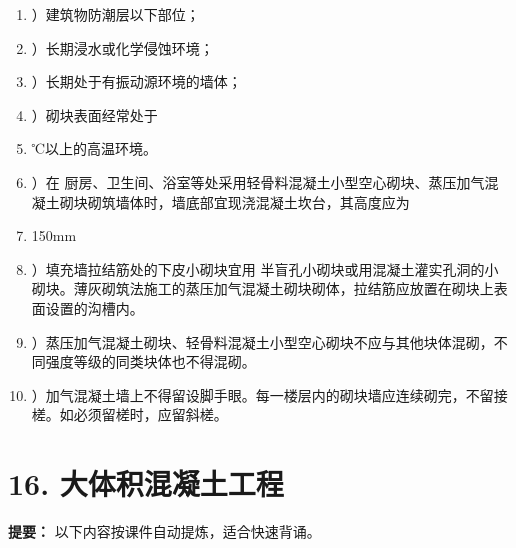 \documentclass[UTF8,fontset=fandol,11pt]{ctexart}
\begin{document}
\begin{enumerate}[label=\arabic*.]
\item ）建筑物防潮层以下部位；

\item ）长期浸水或化学侵蚀环境；

\item ）长期处于有振动源环境的墙体；

\item ）砌块表面经常处于

\item ℃以上的高温环境。

\item ）在 厨房、卫生间、浴室等处采用轻骨料混凝土小型空心砌块、蒸压加气混凝土砌块砌筑墙体时，墙底部宜现浇混凝土坎台，其高度应为

\item 150mm

\item ）填充墙拉结筋处的下皮小砌块宜用 半盲孔小砌块或用混凝土灌实孔洞的小砌块。薄灰砌筑法施工的蒸压加气混凝土砌块砌体，拉结筋应放置在砌块上表面设置的沟槽内。

\item ）蒸压加气混凝土砌块、轻骨料混凝土小型空心砌块不应与其他块体混砌，不同强度等级的同类块体也不得混砌。

\item ）加气混凝土墙上不得留设脚手眼。每一楼层内的砌块墙应连续砌完，不留接槎。如必须留槎时，应留斜槎。

\end{enumerate}

\newpage

\section*{16. 大体积混凝土工程}


\begin{mainbox}

\textbf{提要：} 以下内容按课件自动提炼，适合快速背诵。

\end{mainbox}
\end{document}
